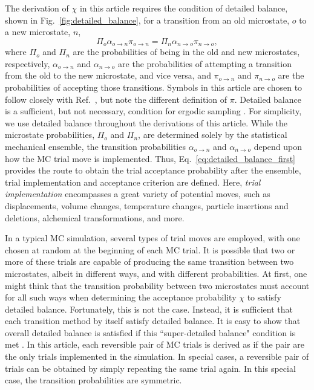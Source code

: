 The derivation of $\chi$ in this article requires the condition of detailed balance, shown in Fig.~\ref{fig:detailed_balance}, for a transition from an old microstate, $o$ to a new microstate, $n$,
\begin{equation}
\Pi_o\alpha_{o\rightarrow n}\pi_{o\rightarrow n} = \Pi_n\alpha_{n\rightarrow o}\pi_{n\rightarrow o},
\label{eq:detailed_balance_first}
\end{equation}
where $\Pi_o$ and $\Pi_n$ are the probabilities of being in the old and new microstates, respectively, $\alpha_{o\rightarrow n}$ and $\alpha_{n\rightarrow o}$ are the probabilities of attempting a transition from the old to the new microstate, and vice versa, and $\pi_{o\rightarrow n}$ and $\pi_{n\rightarrow o}$ are the probabilities of accepting those transitions.
Symbols in this article are chosen to follow closely with Ref.~\cite{frenkel_understanding_2002}, but note the different definition of $\pi$.
Detailed balance is a sufficient, but not necessary, condition for ergodic sampling \cite{manousiouthakis_strict_1999}.
For simplicity, we use detailed balance throughout the derivations of this article.
While the microstate probabilities, $\Pi_o$ and $\Pi_n$, are determined solely by the statistical mechanical ensemble, the transition probabilities $\alpha_{o\rightarrow n}$ and $\alpha_{n\rightarrow o}$ depend upon how the MC trial move is implemented.
Thus, Eq.~\ref{eq:detailed_balance_first} provides the route to obtain the trial acceptance probability after the ensemble, trial implementation and acceptance criterion are defined.
Here, \emph{trial implementation} encompasses a great variety of potential moves, such as displacements, volume changes, temperature changes, particle insertions and deletions, alchemical transformations, and more.

In a typical MC simulation, several types of trial moves are employed, with one chosen at random at the beginning of each MC trial.
It is possible that two or more of these trials are capable of producing the same transition between two microstates, albeit in different ways, and with different probabilities.
At first, one might think that the transition probability between two microstates must account for all such ways when determining the acceptance probability $\chi$ to satisfy detailed balance.
Fortunately, this is not the case.
Instead, it is sufficient that each transition method by itself satisfy detailed balance.
It is easy to show that overall detailed balance is satisfied if this ``super-detailed balance" condition is met \cite{frenkel_speed-up_2004}.
In this article, each reversible pair of MC trials is derived as if the pair are the only trials implemented in the simulation.
In special cases, a reversible pair of trials can be obtained by simply repeating the same trial again.
In this special case, the transition probabilities are symmetric.

